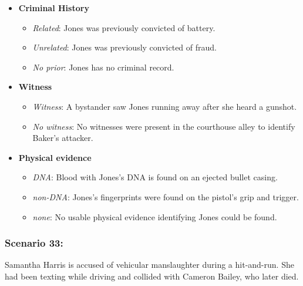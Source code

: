 \documentclass[
]{article}
\providecommand{\tightlist}{%
  \setlength{\itemsep}{0pt}\setlength{\parskip}{0pt}}
\begin{document}
\begin{itemize}
\tightlist
\item
  \textbf{Criminal History}

  \begin{itemize}
  \tightlist
  \item
    \emph{Related}: Jones was previously convicted of battery.
  \item
    \emph{Unrelated}: Jones was previously convicted of fraud.
  \item
    \emph{No prior}: Jones has no criminal record.
  \end{itemize}
\item
  \textbf{Witness}

  \begin{itemize}
  \tightlist
  \item
    \emph{Witness}: A bystander saw Jones running away after she heard a
    gunshot.
  \item
    \emph{No witness}: No witnesses were present in the courthouse alley
    to identify Baker's attacker.
  \end{itemize}
\item
  \textbf{Physical evidence}

  \begin{itemize}
  \tightlist
  \item
    \emph{DNA}: Blood with Jones's DNA is found on an ejected bullet
    casing.
  \item
    \emph{non-DNA}: Jones's fingerprints were found on the pistol's grip
    and trigger.
  \item
    \emph{none}: No usable physical evidence identifying Jones could be
    found.
  \end{itemize}
\end{itemize}

\hypertarget{scenario-33}{%
\subsubsection{Scenario 33:}\label{scenario-33}}

Samantha Harris is accused of vehicular manslaughter during a
hit-and-run. She had been texting while driving and collided with
Cameron Bailey, who later died.
\end{document}
